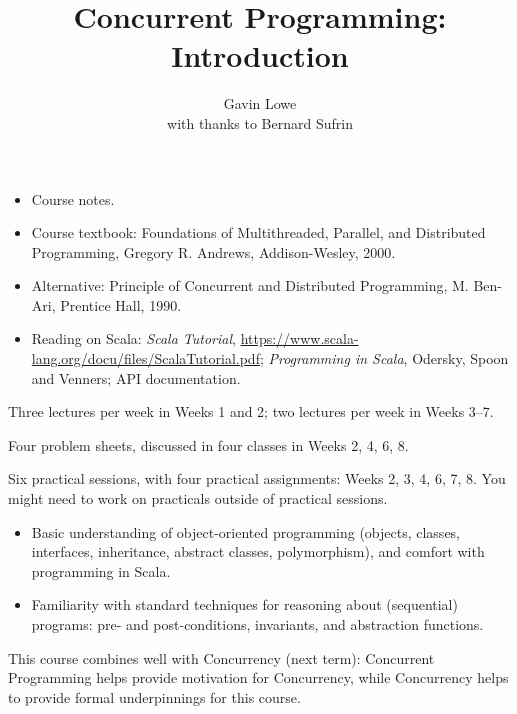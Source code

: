 \documentclass[notes,color]{sepslide0}
\title{Concurrent Programming: Introduction}
\author{Gavin Lowe \\ with thanks to Bernard Sufrin}
\begin{document}
\begin{slide}
  
  \Title

\end{slide}

\begin{slide}

\begin{itemize}
\item Course notes.

\item Course textbook: Foundations of Multithreaded, Parallel, and Distributed
Programming, Gregory R. Andrews, Addison-Wesley, 2000.

\item
Alternative: Principle of Concurrent and Distributed Programming, M. Ben-Ari,
Prentice Hall, 1990.

\item Reading on Scala: \emph{Scala Tutorial},
  \url{https://www.scala-lang.org/docu/files/ScalaTutorial.pdf}; 
  \emph{Programming in Scala}, Odersky, Spoon and Venners; API documentation.
\end{itemize}
\end{slide}


\begin{slide}

Three lectures per week in Weeks 1 and 2; two lectures per week in Weeks 3--7.


Four problem sheets, discussed in four classes in Weeks 2, 4, 6, 8.

Six practical sessions, with four practical assignments: Weeks 2,
3, 4, 6, 7, 8.  You might need to work on practicals outside of practical
sessions.
\end{slide}


\begin{slide}

\begin{itemize}
\item Basic understanding of object-oriented programming (objects, classes,
interfaces, inheritance, abstract classes, polymorphism), and comfort with
programming in Scala.

\item Familiarity with standard techniques for reasoning about (sequential)
programs:  pre- and post-conditions, invariants, and abstraction functions.
\end{itemize}

This course combines well with Concurrency (next term): Concurrent Programming
helps provide motivation for Concurrency, while Concurrency helps to provide
formal underpinnings for this course.
\end{slide}
\end{document}
